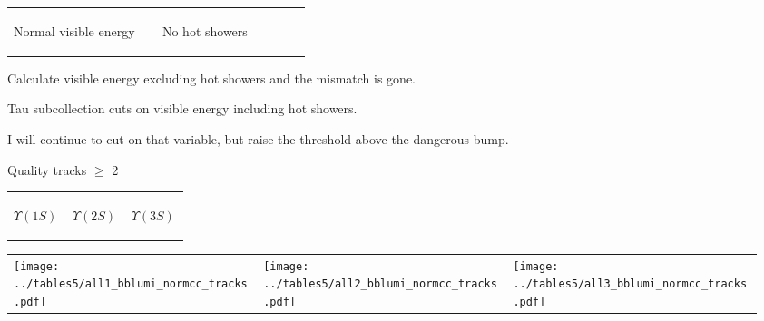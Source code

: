 \documentclass[landscape]{article}
\begin{document}
\begin{tabular}{p{0.45\linewidth} p{0.45\linewidth}}
  \begin{minipage}{\linewidth} \begin{center} Normal visible energy \end{center} \end{minipage} &
  \begin{minipage}{\linewidth} \begin{center} No hot showers \end{center} \end{minipage}
\end{tabular}

\vfill

Calculate visible energy excluding hot showers and the mismatch is gone.

\vfill

Tau subcollection cuts on visible energy including hot showers.

\vfill

I will continue to cut on that variable, but raise the threshold
above the dangerous bump.

\vfill

\pagebreak

Quality tracks $\ge$ 2

\vspace{-1.75 cm}
\begin{center}
  \begin{tabular}{p{0.32\linewidth} p{0.32\linewidth} p{0.32\linewidth}}
    \begin{center} $\Upsilon(1S)$ \end{center} & \begin{center} $\Upsilon(2S)$ \end{center} & \begin{center} $\Upsilon(3S)$ \end{center} \\
  \end{tabular}

  \vspace{-0.75 cm}
  \begin{tabular}{p{0.32\linewidth} p{0.32\linewidth} p{0.32\linewidth}}
    \texttt{[image: ../tables5/all1\_bblumi\_normcc\_tracks.pdf]} &
    \texttt{[image: ../tables5/all2\_bblumi\_normcc\_tracks.pdf]} &
    \texttt{[image: ../tables5/all3\_bblumi\_normcc\_tracks.pdf]}
  \end{tabular}
\end{center}
\end{document}
